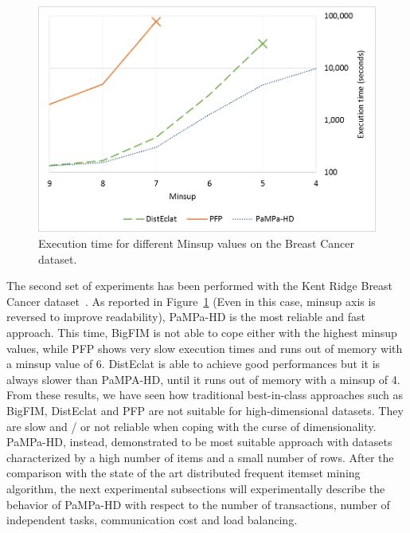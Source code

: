 \begin{figure}[!t]
\includegraphics[width=5in]{immagini_extension/breast_confronto.png}
\caption{Execution time for different Minsup values on the Breast Cancer dataset.}
\label{breast_confronto}
\end{figure}
The second set of experiments has been performed with the Kent Ridge Breast
Cancer dataset~\cite{breast_cancer_dataset}.
As reported in Figure~\ref{breast_confronto} (Even in this case, minsup axis is reversed to improve readability), PaMPa-HD is the most reliable and fast approach.
This time, BigFIM is not able to cope either with the highest minsup values, while PFP shows very slow execution times and runs out of memory with a minsup value of 6.
DistEclat is able to achieve good performances but it is always slower than PaMPA-HD, until it runs out of memory with a minsup of 4.
From these results, we have seen how  traditional best-in-class approaches such as BigFIM, DistEclat and PFP are not suitable for high-dimensional datasets. They are slow and / or not reliable when coping with the curse of dimensionality. PaMPa-HD, instead, demonstrated to be most suitable approach with datasets characterized by a high number of items and a small number of rows.
After the comparison with the state of the art distributed frequent itemset mining algorithm, the next experimental subsections will experimentally describe the behavior of PaMPa-HD with respect to the number of transactions, number of independent tasks, communication cost and load balancing.

